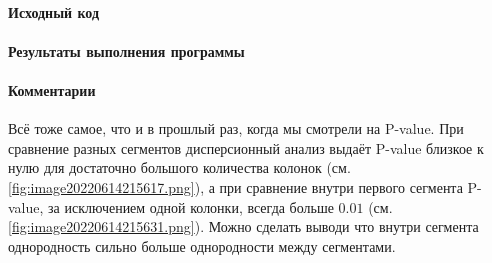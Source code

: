 \documentclass[12pt,a4paper]{article}
\begin{document}
  \paragraph*{Исходный код}
\begin{Shaded}
\begin{Highlighting}[]
\NormalTok{f\_oneway(X[labels }\OperatorTok{==} \NormalTok{], X[labels }\OperatorTok{==} \NormalTok{]).pvalue}
\end{Highlighting}
\end{Shaded}

\begin{Shaded}
\begin{Highlighting}[]
\OperatorTok{*}\NormalTok{split(X[labels }\OperatorTok{==} \NormalTok{])).pvalue}
\end{Highlighting}
\end{Shaded}

  \paragraph*{Результаты выполнения программы}

  \paragraph*{Комментарии}
  Всё тоже самое, что и в прошлый раз, когда мы смотрели на P-value.
  При сравнение разных сегментов дисперсионный анализ выдаёт P-value близкое к нулю для достаточно большого количества колонок
  (см. \autoref{fig:image20220614215617.png}),
  а при сравнение внутри первого сегмента P-value, за исключением одной колонки, всегда больше $0.01$ (см. \autoref{fig:image20220614215631.png}).
  Можно сделать выводи что внутри сегмента однородность сильно больше однородности между сегментами.

  \newpage
\end{document}
